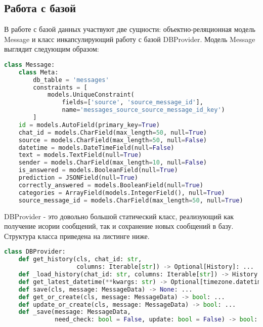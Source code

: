     \subsection{Работа с базой}
    В работе с базой данных участвуют две сущности: объектно-реляционная модель Message
    и класс инкапсулирующий работу с базой DBProvider.
    Модель Message выглядит следующим образом:
\begin{lstlisting}[language=Python]
class Message:
    class Meta:
        db_table = 'messages'
        constraints = [
            models.UniqueConstraint(
                fields=['source', 'source_message_id'],
                name='messages_source_source_message_id_key')
        ]
    id = models.AutoField(primary_key=True)
    chat_id = models.CharField(max_length=50, null=True)
    source = models.CharField(max_length=50, null=False)
    datetime = models.DateTimeField(null=False)
    text = models.TextField(null=True)
    sender = models.CharField(max_length=10, null=False)
    is_answered = models.BooleanField(null=True)
    prediction = JSONField(null=True)
    correctly_answered = models.BooleanField(null=True)
    categories = ArrayField(models.IntegerField(), null=True)
    source_message_id = models.CharField(max_length=50, null=True)
\end{lstlisting}

    DBProvider - это довольно большой статический класс, реализующий как получение исории сообщений,
    так и сохранение новых сообщений в базу.
    Структура класса приведена на листинге ниже.
\begin{lstlisting}[language=Python]
class DBProvider:
    def get_history(cls, chat_id: str, 
                    columns: Iterable[str]) -> Optional[History]: ...
    def _load_history(chat_id: str, columns: Iterable[str]) -> History: ...
    def get_latest_datetime(**kwargs: str) -> Optional[timezone.datetime]: ...
    def save(cls, message: MessageData) -> None: ...
    def get_or_create(cls, message: MessageData) -> bool: ...
    def update_or_create(cls, message: MessageData) -> bool: ...
    def _save(message: MessageData, 
              need_check: bool = False, update: bool = False) -> bool: ...
\end{lstlisting}

